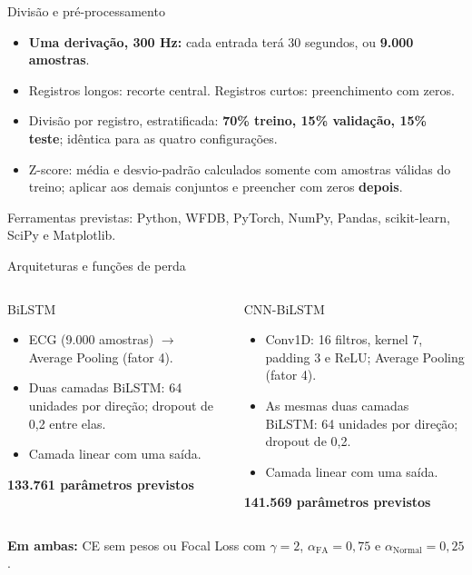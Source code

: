 \documentclass[aspectratio=169,12pt,brazil]{beamer}
\begin{document}
\begin{frame}{Divisão e pré-processamento}
  \begin{itemize}
    \item \textbf{Uma derivação, 300 Hz:} cada entrada terá 30 segundos, ou \textbf{9.000 amostras}.
    \item Registros longos: recorte central. Registros curtos: preenchimento com zeros.
    \item Divisão por registro, estratificada: \textbf{70\% treino, 15\% validação, 15\% teste}; idêntica para as quatro configurações.
    \item Z-score: média e desvio-padrão calculados somente com amostras válidas do treino; aplicar aos demais conjuntos e preencher com zeros \textbf{depois}.
  \end{itemize}
  \small Ferramentas previstas: Python, WFDB, PyTorch, NumPy, Pandas, scikit-learn, SciPy e Matplotlib.
\end{frame}

\begin{frame}{Arquiteturas e funções de perda}
  \begin{columns}[T,onlytextwidth]
    \begin{block}{BiLSTM}
      \footnotesize
      \begin{itemize}
        \item ECG (9.000 amostras) $\rightarrow$ Average Pooling (fator 4).
        \item Duas camadas BiLSTM: 64 unidades por direção; dropout de 0,2 entre elas.
        \item Camada linear com uma saída.
      \end{itemize}
      \centering \textbf{133.761 parâmetros previstos}
    \end{block}
    \begin{block}{CNN-BiLSTM}
      \footnotesize
      \begin{itemize}
        \item Conv1D: 16 filtros, kernel 7, padding 3 e ReLU; Average Pooling (fator 4).
        \item As mesmas duas camadas BiLSTM: 64 unidades por direção; dropout de 0,2.
        \item Camada linear com uma saída.
      \end{itemize}
      \centering \textbf{141.569 parâmetros previstos}
    \end{block}
  \end{columns}
  \vspace{.15cm}
  \small \textbf{Em ambas:} CE sem pesos ou Focal Loss com $\gamma=2$, $\alpha_{\mathrm{FA}}=0{,}75$ e $\alpha_{\mathrm{Normal}}=0{,}25$.
\end{frame}
\end{document}
